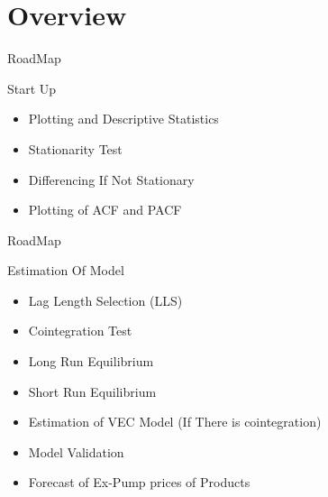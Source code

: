 \documentclass{beamer}
\newcommand{\vspaceFive}{\vspace{5pt}}
\begin{document}
	\section{Overview}
	\begin{frame}{RoadMap}
		\begin{block}{Start Up}
			\vspaceFive
			\begin{itemize}[label=$\diamond$, leftmargin=2em, itemsep=1em]
				\item Plotting and Descriptive Statistics
				\item Stationarity Test
				\item Differencing If Not Stationary
				\item Plotting of ACF and PACF
			\end{itemize}
			\vspaceFive
		\end{block}
	\end{frame}

	\begin{frame}{RoadMap}
		\begin{block}{Estimation Of Model}
			\vspaceFive
			\begin{itemize}[label=$\diamond$, leftmargin=2em, itemsep=1em]
				\item Lag Length Selection (LLS)
				\item Cointegration Test
				\item Long Run Equilibrium
				\item Short Run Equilibrium
				\item Estimation of VEC Model (If There is cointegration)
				\item Model Validation
				\item Forecast of Ex-Pump prices of Products
			\end{itemize}
			\vspaceFive
		\end{block}
		
	\end{frame}

	
\end{document}
